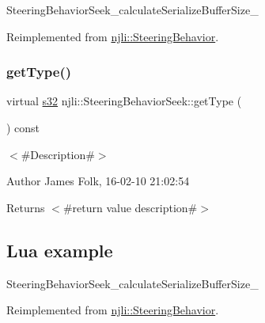 \begin{DoxyCodeInclude}
\end{DoxyCodeInclude}
Steering\+Behavior\+Seek\+\_\+calculate\+Serialize\+Buffer\+Size\+\_\+ 

Reimplemented from \mbox{\hyperlink{classnjli_1_1_steering_behavior_abb58d6982dc295fc3e90f096f51b0ef8}{njli\+::\+Steering\+Behavior}}.

\mbox{\label{classnjli_1_1_steering_behavior_seek_af2f037a05124681d1c73ca801a0d4d71}} 
\subsubsection{\texorpdfstring{get\+Type()}{getType()}}
{\footnotesize\ttfamily virtual \mbox{\hyperlink{_util_8h_aa62c75d314a0d1f37f79c4b73b2292e2}{s32}} njli\+::\+Steering\+Behavior\+Seek\+::get\+Type (\begin{DoxyParamCaption}{ }\end{DoxyParamCaption}) const\hspace{0.3cm}{\ttfamily [virtual]}}



$<$\#\+Description\#$>$ 

\begin{DoxyAuthor}{Author}
James Folk, 16-\/02-\/10 21\+:02\+:54
\end{DoxyAuthor}
\begin{DoxyReturn}{Returns}
$<$\#return value description\#$>$
\end{DoxyReturn}
\hypertarget{classnjli_1_1_steering_behavior_wander_ex1}{}\subsection{Lua example}\label{classnjli_1_1_steering_behavior_wander_ex1}

\begin{DoxyCodeInclude}
\end{DoxyCodeInclude}
Steering\+Behavior\+Seek\+\_\+calculate\+Serialize\+Buffer\+Size\+\_\+ 

Reimplemented from \mbox{\hyperlink{classnjli_1_1_steering_behavior_ae82bca8468d41aff8c22b76fd359fe9b}{njli\+::\+Steering\+Behavior}}.

\mbox{\label{classnjli_1_1_steering_behavior_seek_a5a32ccc98ee9030ea757ea01b85385a0}} 
